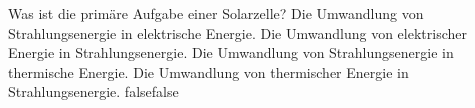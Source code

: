     {Was ist die primäre Aufgabe einer Solarzelle?}
    {Die Umwandlung von Strahlungsenergie in elektrische Energie.}
    {Die Umwandlung von elektrischer Energie in Strahlungsenergie.}
    {Die Umwandlung von Strahlungsenergie in thermische Energie.}
    {Die Umwandlung von thermischer Energie in Strahlungsenergie.}
    {false}{false}